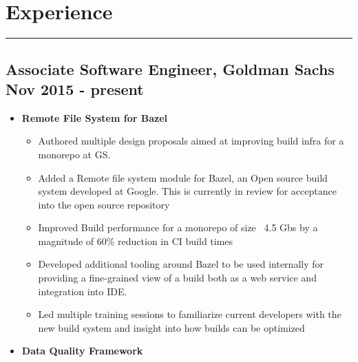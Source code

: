\section*{Experience}
\hrule
\vspace{0.3cm}
\subsection*{\small{Associate Software Engineer, Goldman Sachs \hfill Nov 2015 - present}}
\begin{itemize}[label=\textperiodcentered,labelindent=0pt,itemindent=1em,leftmargin=0.3cm,itemsep=0pt]
    \begin{itemize}[label=\textperiodcentered,itemindent=1em,leftmargin=0.3cm,itemsep=0pt]
        \item \textbf{Remote File System for Bazel}
            \begin{itemize}
                \item {Authored multiple design proposals aimed at improving build infra for a monorepo at GS.}
                \item {Added a Remote file system module for Bazel, an Open source build system developed at Google. This is currently in review for acceptance into the open source repository}
                \item Improved Build performance for a monorepo of size ~4.5 Gbs by a magnitude of 60\% reduction in CI build times
                \item Developed additional tooling around Bazel to be used internally for providing a fine-grained view of a build both as a web service and integration into IDE. 
                \item Led multiple training sessions to familiarize current developers with the new build system and insight into how builds can be optimized
            \end{itemize}
            
        \item \textbf{Data Quality Framework}
        

\end{itemize}
\end{itemize}
